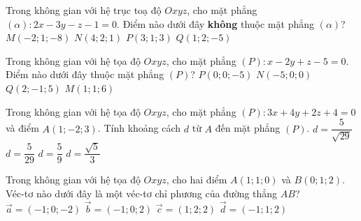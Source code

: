 \begin{ex}%
	Trong không gian với hệ trục toạ độ $Oxyz$, cho mặt phẳng $\left(\alpha \right):2x-3y-z-1=0$. Điểm nào dưới đây \textbf{không} thuộc mặt phẳng $\left(\alpha \right)$?
	\choice
	{$M\left(-2;1;-8\right)$}
	{$N\left(4;2;1\right)$}
	{\True $P\left(3;1;3\right)$}
	{$Q\left(1;2;-5\right)$}
\end{ex}
\begin{ex}%
	Trong không gian với hệ tọa độ $Oxyz$, cho mặt phẳng $(P):x-2y+z-5=0$. Điểm nào dưới đây thuộc mặt phẳng $(P)$?
	\choice
	{$P(0;0;-5)$}
	{$N(-5;0;0)$}
	{$Q(2;-1;5)$}
	{\True $M(1;1;6)$}
\end{ex}
\begin{ex}%
	Trong không gian với hệ tọa độ $Oxyz$, cho mặt phẳng $(P): 3x+4y+2z+4=0$ và điểm $A\left(1;-2;3\right)$. Tính khoảng cách $d$ từ $A$ đến mặt phẳng $(P)$.
	\choice
	{\True $d=\dfrac{5}{\sqrt{29}}$}
	{$d=\dfrac{5}{29}$}
	{$d=\dfrac{5}{9}$}
	{$d=\dfrac{\sqrt{5}}{3}$}
\end{ex}
\begin{ex}%
	Trong không gian với hệ tọa độ $Oxyz$, cho hai điểm $A(1;1;0)$ và $B(0;1;2)$. Véc-tơ nào dưới đây là một véc-tơ chỉ phương của đường thẳng $AB$?
	\choice
	{$\vec{a}=(-1;0;-2)$}
	{\True $\vec{b}=(-1;0;2)$}
	{$\vec{c}=(1;2;2)$}
	{$\vec{d}=(-1;1;2)$}
\end{ex}
